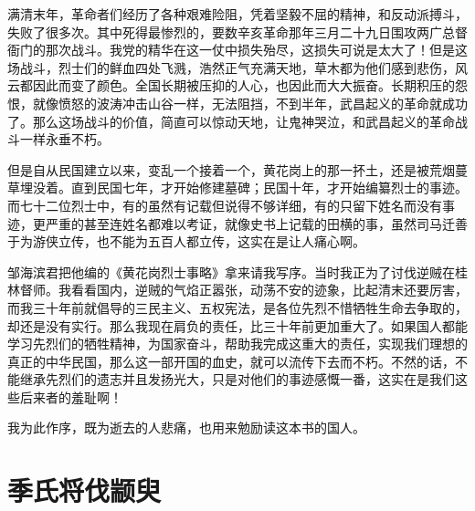 \documentclass[12pt,UTF-8,openany]{ctexbook}
\begin{document}
\begin{normalsize}
    
    满清末年，革命者们经历了各种艰难险阻，凭着坚毅不屈的精神，和反动派搏斗，失败了很多次。其中死得最惨烈的，要数辛亥革命那年三月二十九日围攻两广总督衙门的那次战斗。我党的精华在这一仗中损失殆尽，这损失可说是太大了！但是这场战斗，烈士们的鲜血四处飞溅，浩然正气充满天地，草木都为他们感到悲伤，风云都因此而变了颜色。全国长期被压抑的人心，也因此而大大振奋。长期积压的怨恨，就像愤怒的波涛冲击山谷一样，无法阻挡，不到半年，武昌起义的革命就成功了。那么这场战斗的价值，简直可以惊动天地，让鬼神哭泣，和武昌起义的革命战斗一样永垂不朽。
    
    但是自从民国建立以来，变乱一个接着一个，黄花岗上的那一抔土，还是被荒烟蔓草埋没着。直到民国七年，才开始修建墓碑；民国十年，才开始编纂烈士的事迹。而七十二位烈士中，有的虽然有记载但说得不够详细，有的只留下姓名而没有事迹，更严重的甚至连姓名都难以考证，就像史书上记载的田横的事，虽然司马迁善于为游侠立传，也不能为五百人都立传，这实在是让人痛心啊。
    
    邹海滨君把他编的《黄花岗烈士事略》拿来请我写序。当时我正为了讨伐逆贼在桂林督师。我看看国内，逆贼的气焰正嚣张，动荡不安的迹象，比起清末还要厉害，而我三十年前就倡导的三民主义、五权宪法，是各位先烈不惜牺牲生命去争取的，却还是没有实行。那么我现在肩负的责任，比三十年前更加重大了。如果国人都能学习先烈们的牺牲精神，为国家奋斗，帮助我完成这重大的责任，实现我们理想的真正的中华民国，那么这一部开国的血史，就可以流传下去而不朽。不然的话，不能继承先烈们的遗志并且发扬光大，只是对他们的事迹感慨一番，这实在是我们这些后来者的羞耻啊！
    
    我为此作序，既为逝去的人悲痛，也用来勉励读这本书的国人。
    
\end{normalsize}



\chapter{季氏将伐颛臾}
\end{document}
